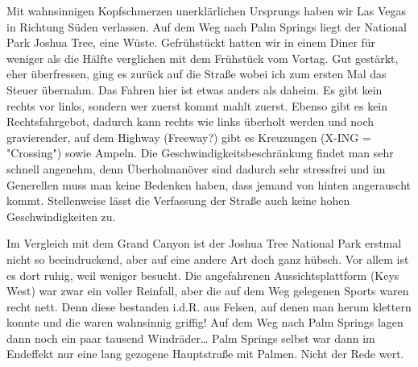 Mit wahnsinnigen Kopfschmerzen unerklärlichen Ursprungs haben wir Las Vegas in Richtung Süden verlassen.
Auf dem Weg nach Palm Springs liegt der National Park Joshua Tree, eine Wüste.
Gefrühstückt hatten wir in einem Diner für weniger als die Hälfte verglichen mit dem Frühstück vom Vortag.
Gut gestärkt, eher überfressen, ging es zurück auf die Straße wobei ich zum ersten Mal das Steuer übernahm.
Das Fahren hier ist etwas anders als daheim. Es gibt kein rechts vor links, sondern wer zuerst kommt mahlt zuerst.
Ebenso gibt es kein Rechtsfahrgebot, dadurch kann rechts wie links überholt werden und noch gravierender, auf dem Highway (Freeway?) gibt es Kreuzungen (X-ING = "Crossing") sowie Ampeln.
Die Geschwindigkeitsbeschränkung findet man sehr schnell angenehm, denn Überholmanöver sind dadurch sehr stressfrei und im Generellen muss man keine Bedenken haben, dass jemand von hinten angerauscht kommt.
Stellenweise lässt die Verfassung der Straße auch keine hohen Geschwindigkeiten zu.

Im Vergleich mit dem Grand Canyon ist der Joshua Tree National Park erstmal nicht so beeindruckend, aber auf eine andere Art doch ganz hübsch.
Vor allem ist es dort ruhig, weil weniger besucht.
Die angefahrenen Aussichtsplattform (Keys West) war zwar ein voller Reinfall, aber die auf dem Weg gelegenen Sports waren recht nett.
Denn diese bestanden i.d.R. aus Felsen, auf denen man herum klettern konnte und die waren wahnsinnig griffig!
Auf dem Weg nach Palm Springs lagen dann noch ein paar tausend Windräder\dots
Palm Springs selbst war dann im Endeffekt nur eine lang gezogene Hauptstraße mit Palmen.
Nicht der Rede wert.
